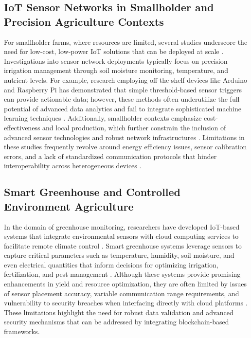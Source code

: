 \documentclass[12pt,onecolumn]{IEEEtran} %
\begin{document}
\subsection{IoT Sensor Networks in Smallholder and Precision Agriculture Contexts}
For smallholder farms, where resources are limited, several studies underscore the need for low-cost, low-power IoT solutions that can be deployed at scale \cite{abunadi2022trafficawaresecuredcooperative, bayih2022utilizationofinternet}. Investigations into sensor network deployments typically focus on precision irrigation management through soil moisture monitoring, temperature, and nutrient levels. For example, research employing off-the-shelf devices like Arduino and Raspberry Pi has demonstrated that simple threshold-based sensor triggers can provide actionable data; however, these methods often underutilize the full potential of advanced data analytics and fail to integrate sophisticated machine learning techniques \cite{bayih2022utilizationofinternet, bayih2022utilizationofinternet}. Additionally, smallholder contexts emphasize cost-effectiveness and local production, which further constrain the inclusion of advanced sensor technologies and robust network infrastructures \cite{bayih2022utilizationofinternet, bayih2022utilizationofinternet}. Limitations in these studies frequently revolve around energy efficiency issues, sensor calibration errors, and a lack of standardized communication protocols that hinder interoperability across heterogeneous devices \cite{bayih2022utilizationofinternet, bayih2022utilizationofinternet}.

\subsection{Smart Greenhouse and Controlled Environment Agriculture}
In the domain of greenhouse monitoring, researchers have developed IoT-based systems that integrate environmental sensors with cloud computing services to facilitate remote climate control \cite{viswanatha2022implementationofiot, simo2022smartagricultureiotbased}. Smart greenhouse systems leverage sensors to capture critical parameters such as temperature, humidity, soil moisture, and even electrical quantities that inform decisions for optimizing irrigation, fertilization, and pest management \cite{simo2022smartagricultureiotbased}. Although these systems provide promising enhancements in yield and resource optimization, they are often limited by issues of sensor placement accuracy, variable communication range requirements, and vulnerability to security breaches when interfacing directly with cloud platforms \cite{viswanatha2022implementationofiot, abunadi2022trafficawaresecuredcooperative}. These limitations highlight the need for robust data validation and advanced security mechanisms that can be addressed by integrating blockchain-based frameworks.
\end{document}
